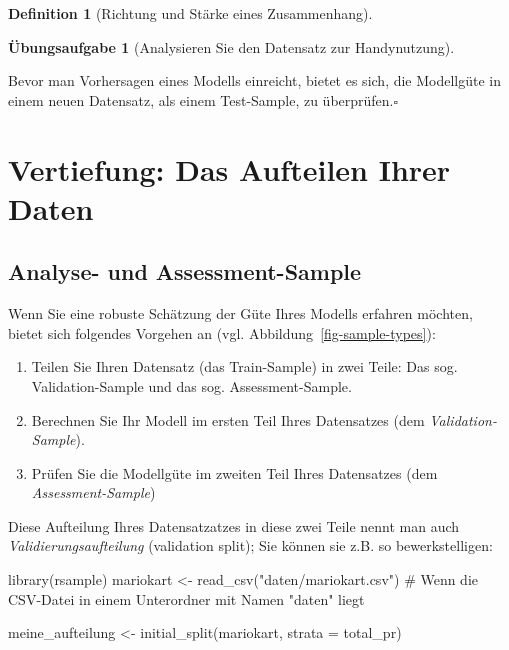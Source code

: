 \documentclass[
  a4paper,
  DIV=11]{scrreprt}
\newenvironment{Shaded}{\begin{snugshade}}{\end{snugshade}}
\newcommand{\AttributeTok}[1]{\textcolor[rgb]{0.40,0.45,0.13}{#1}}
\newcommand{\CommentTok}[1]{\textcolor[rgb]{0.37,0.37,0.37}{#1}}
\newcommand{\FunctionTok}[1]{\textcolor[rgb]{0.28,0.35,0.67}{#1}}
\newcommand{\NormalTok}[1]{\textcolor[rgb]{0.00,0.23,0.31}{#1}}
\newcommand{\OtherTok}[1]{\textcolor[rgb]{0.00,0.23,0.31}{#1}}
\newcommand{\StringTok}[1]{\textcolor[rgb]{0.13,0.47,0.30}{#1}}
\providecommand{\tightlist}{%
  \setlength{\itemsep}{0pt}\setlength{\parskip}{0pt}}\usepackage{longtable,booktabs,array}
\theoremstyle{definition}
\newtheorem{exercise}{Übungsaufgabe}[chapter]
\theoremstyle{definition}
\theoremstyle{definition}
\newtheorem{definition}{Definition}[chapter]
\theoremstyle{remark}
\begin{document}
\begin{definition}[Richtung und Stärke eines
Zusammenhang]
\begin{exercise}[Analysieren Sie den Datensatz zur
Handynutzung]
\begin{tcolorbox}
Bevor man Vorhersagen eines Modells einreicht, bietet es sich, die
Modellgüte in einem neuen Datensatz, als einem Test-Sample, zu
überprüfen.\(\square\)

\end{tcolorbox}

\section{Vertiefung: Das Aufteilen Ihrer
Daten}\label{vertiefung-das-aufteilen-ihrer-daten}

\subsection{Analyse- und
Assessment-Sample}\label{analyse--und-assessment-sample}

Wenn Sie eine robuste Schätzung der Güte Ihres Modells erfahren möchten,
bietet sich folgendes Vorgehen an (vgl.
Abbildung~\ref{fig-sample-types}):

\begin{enumerate}
\def\labelenumi{\arabic{enumi}.}
\tightlist
\item
  Teilen Sie Ihren Datensatz (das Train-Sample) in zwei Teile: Das sog.
  Validation-Sample und das sog. Assessment-Sample.
\item
  Berechnen Sie Ihr Modell im ersten Teil Ihres Datensatzes (dem
  \emph{Validation-Sample}).
\item
  Prüfen Sie die Modellgüte im zweiten Teil Ihres Datensatzes (dem
  \emph{Assessment-Sample})
\end{enumerate}

Diese Aufteilung Ihres Datensatzatzes in diese zwei Teile nennt man auch
\emph{Validierungsaufteilung} (validation split); Sie können sie z.B. so
bewerkstelligen:

\begin{Shaded}
\begin{Highlighting}[]
\FunctionTok{library}\NormalTok{(rsample)}
\NormalTok{mariokart }\OtherTok{\textless{}{-}} \FunctionTok{read\_csv}\NormalTok{(}\StringTok{"daten/mariokart.csv"}\NormalTok{)  }\CommentTok{\# Wenn die CSV{-}Datei in einem Unterordner mit Namen "daten" liegt}

\NormalTok{meine\_aufteilung }\OtherTok{\textless{}{-}} \FunctionTok{initial\_split}\NormalTok{(mariokart, }\AttributeTok{strata =}\NormalTok{ total\_pr)}
\end{Highlighting}
\end{Shaded}


\end{exercise}
\end{definition}
\end{document}
